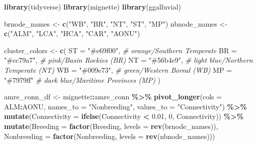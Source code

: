 \documentclass[
]{book}
\newenvironment{Shaded}{\begin{snugshade}}{\end{snugshade}}
\newcommand{\AttributeTok}[1]{\textcolor[rgb]{0.13,0.29,0.53}{#1}}
\newcommand{\CommentTok}[1]{\textcolor[rgb]{0.56,0.35,0.01}{\textit{#1}}}
\newcommand{\DecValTok}[1]{\textcolor[rgb]{0.00,0.00,0.81}{#1}}
\newcommand{\FloatTok}[1]{\textcolor[rgb]{0.00,0.00,0.81}{#1}}
\newcommand{\FunctionTok}[1]{\textcolor[rgb]{0.13,0.29,0.53}{\textbf{#1}}}
\newcommand{\NormalTok}[1]{#1}
\newcommand{\OtherTok}[1]{\textcolor[rgb]{0.56,0.35,0.01}{#1}}
\newcommand{\SpecialCharTok}[1]{\textcolor[rgb]{0.81,0.36,0.00}{\textbf{#1}}}
\newcommand{\StringTok}[1]{\textcolor[rgb]{0.31,0.60,0.02}{#1}}
\begin{document}
\begin{Shaded}
\begin{Highlighting}[]
\FunctionTok{library}\NormalTok{(tidyverse)}
\FunctionTok{library}\NormalTok{(mignette)}
\FunctionTok{library}\NormalTok{(ggalluvial)}

\NormalTok{brnode\_names }\OtherTok{\textless{}{-}} \FunctionTok{c}\NormalTok{(}\StringTok{"WB"}\NormalTok{, }\StringTok{"BR"}\NormalTok{, }\StringTok{"NT"}\NormalTok{, }\StringTok{"ST"}\NormalTok{, }\StringTok{"MP"}\NormalTok{)}
\NormalTok{nbnode\_names }\OtherTok{\textless{}{-}} \FunctionTok{c}\NormalTok{(}\StringTok{"ALM"}\NormalTok{, }\StringTok{"LCA"}\NormalTok{, }\StringTok{"HCA"}\NormalTok{, }\StringTok{"CAR"}\NormalTok{, }\StringTok{"AONU"}\NormalTok{)}

\NormalTok{cluster\_colors }\OtherTok{\textless{}{-}}  \FunctionTok{c}\NormalTok{(}
  \StringTok{\textasciigrave{}}\AttributeTok{ST}\StringTok{\textasciigrave{}} \OtherTok{=} \StringTok{"\#e69f00"}\NormalTok{, }\CommentTok{\# orange/Southern Temperate}
  \StringTok{\textasciigrave{}}\AttributeTok{BR}\StringTok{\textasciigrave{}} \OtherTok{=} \StringTok{"\#cc79a7"}\NormalTok{, }\CommentTok{\# pink/Basin Rockies (BR)}
  \StringTok{\textasciigrave{}}\AttributeTok{NT}\StringTok{\textasciigrave{}} \OtherTok{=} \StringTok{"\#56b4e9"}\NormalTok{, }\CommentTok{\# light blue/Northern Temperate (NT)}
  \StringTok{\textasciigrave{}}\AttributeTok{WB}\StringTok{\textasciigrave{}} \OtherTok{=} \StringTok{"\#009e73"}\NormalTok{, }\CommentTok{\# green/Western Boreal (WB)}
  \StringTok{\textasciigrave{}}\AttributeTok{MP}\StringTok{\textasciigrave{}} \OtherTok{=} \StringTok{"\#7979ff"} \CommentTok{\# dark blue/Maritime Provinces (MP)}
\NormalTok{) }

\NormalTok{amre\_conn\_df }\OtherTok{\textless{}{-}}\NormalTok{ mignette}\SpecialCharTok{::}\NormalTok{amre\_conn }\SpecialCharTok{\%\textgreater{}\%}
  \FunctionTok{pivot\_longer}\NormalTok{(}\AttributeTok{cols =}\NormalTok{ ALM}\SpecialCharTok{:}\NormalTok{AONU, }\AttributeTok{names\_to =} \StringTok{"Nonbreeding"}\NormalTok{, }\AttributeTok{values\_to =} \StringTok{"Connectivity"}\NormalTok{) }\SpecialCharTok{\%\textgreater{}\%}
  \FunctionTok{mutate}\NormalTok{(}\AttributeTok{Connectivity =} \FunctionTok{ifelse}\NormalTok{(Connectivity }\SpecialCharTok{\textless{}} \FloatTok{0.01}\NormalTok{, }\DecValTok{0}\NormalTok{, Connectivity)) }\SpecialCharTok{\%\textgreater{}\%}
  \FunctionTok{mutate}\NormalTok{(}\AttributeTok{Breeding =} \FunctionTok{factor}\NormalTok{(Breeding, }\AttributeTok{levels =} \FunctionTok{rev}\NormalTok{(brnode\_names)),}
         \AttributeTok{Nonbreeding =} \FunctionTok{factor}\NormalTok{(Nonbreeding, }\AttributeTok{levels =} \FunctionTok{rev}\NormalTok{(nbnode\_names)))}


\end{Highlighting}
\end{Shaded}
\end{document}
